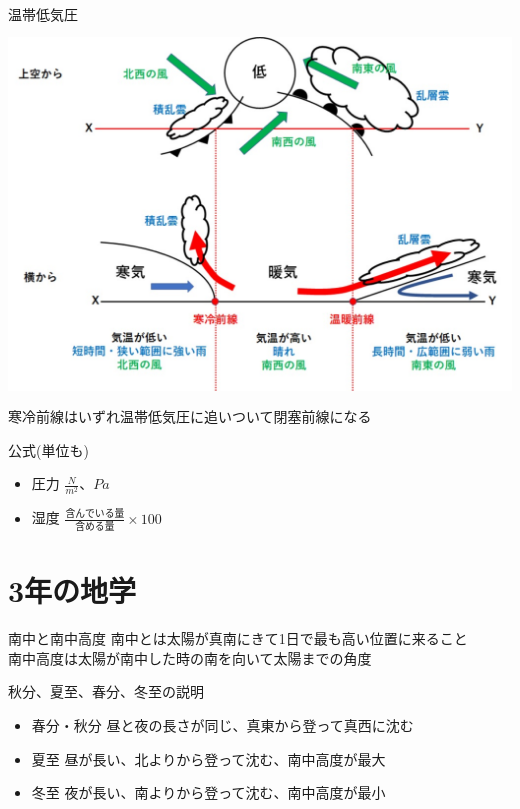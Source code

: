 \documentclass[10pt,dvipdfmx]{jsarticle}
\newcommand{\answer}[2]{{\color{orange}#2}}
\newcommand{\answer}[2]{\vspace{#1mm}}
\begin{document}
\begin{itembox}[l]{温帯低気圧}
	\answer{80}{
		\includegraphics[height=10cm]{science_figure/typhoo.pdf}\\
		寒冷前線はいずれ温帯低気圧に追いついて閉塞前線になる
	}
\end{itembox}

\begin{itembox}[l]{公式(単位も)}
	\begin{Large}
		\begin{itemize}
			\item 圧力 \answer{0}{$\frac{N}{m^2}、Pa$}
			\item 湿度 \answer{0}{$\frac{含んでいる量}{含める量}\times100$}
		\end{itemize}
	\end{Large}
\end{itembox}


\section{3年の地学}
\begin{itembox}[l]{南中と南中高度}
	\answer{10}{南中とは太陽が真南にきて1日で最も高い位置に来ること\\
		南中高度は太陽が南中した時の南を向いて太陽までの角度}
\end{itembox}

\begin{itembox}[l]{秋分、夏至、春分、冬至の説明}
	\answer{20}{
		\begin{itemize}
			\item 春分・秋分 昼と夜の長さが同じ、真東から登って真西に沈む
			\item 夏至 昼が長い、北よりから登って沈む、南中高度が最大
			\item 冬至 夜が長い、南よりから登って沈む、南中高度が最小
		\end{itemize}
	}
\end{itembox}
\end{document}
